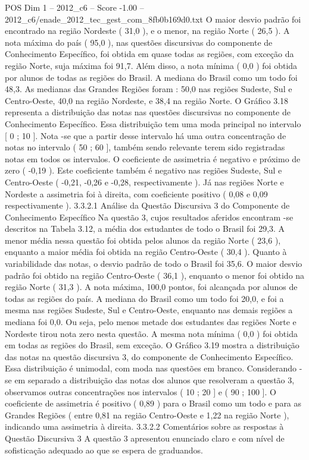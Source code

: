 \begin{textsample}{POS Dim 1 – 2012\_c6 – Score -1.00 – 2012\_c6/enade\_2012\_tec\_gest\_com\_8fb0b169d0.txt}
O maior desvio padrão foi encontrado na região Nordeste ( 31,0 ), e o menor, na região Norte ( 26,5 ).
A nota máxima do país ( 95,0 ), nas questões discursivas do componente de Conhecimento Específico, foi obtida em quase todas as regiões, com exceção da região Norte, suja máxima foi 91,7.
Além disso, a nota mínima ( 0,0 ) foi obtida por alunos de todas as regiões do Brasil.
A mediana do Brasil como um todo foi 48,3.
As medianas das Grandes Regiões foram : 50,0 nas regiões Sudeste, Sul e Centro-Oeste, 40,0 na região Nordeste, e 38,4 na região Norte.
O Gráfico 3.18 representa a distribuição das notas nas questões discursivas no componente de Conhecimento Específico.
Essa distribuição tem uma moda principal no intervalo [ 0 ; 10 ].
Nota -se que a partir desse intervalo há uma outra concentração de notas no intervalo ( 50 ; 60 ], também sendo relevante terem sido registradas notas em todos os intervalos.
O coeficiente de assimetria é negativo e próximo de zero ( -0,19 ).
Este coeficiente também é negativo nas regiões Sudeste, Sul e Centro-Oeste ( -0,21, -0,26 e -0,28, respectivamente ).
Já nas regiões Norte e Nordeste a assimetria foi à direita, com coeficiente positivo ( 0,08 e 0,09 respectivamente ). 3.3.2.1 Análise da Questão Discursiva 3 do Componente de Conhecimento Específico Na questão 3, cujos resultados aferidos encontram -se descritos na Tabela 3.12, a média dos estudantes de todo o Brasil foi 29,3.
A menor média nessa questão foi obtida pelos alunos da região Norte ( 23,6 ), enquanto a maior média foi obtida na região Centro-Oeste ( 30,4 ).
Quanto à variabilidade das notas, o desvio padrão de todo o Brasil foi 35,6.
O maior desvio padrão foi obtido na região Centro-Oeste ( 36,1 ), enquanto o menor foi obtido na região Norte ( 31,3 ).
A nota máxima, 100,0 pontos, foi alcançada por alunos de todas as regiões do país.
A mediana do Brasil como um todo foi 20,0, e foi a mesma nas regiões Sudeste, Sul e Centro-Oeste, enquanto nas demais regiões a mediana foi 0,0.
Ou seja, pelo menos metade dos estudantes das regiões Norte e Nordeste tirou nota zero nesta questão.
A mesma nota mínima ( 0,0 ) foi obtida em todas as regiões do Brasil, sem exceção.
O Gráfico 3.19 mostra a distribuição das notas na questão discursiva 3, do componente de Conhecimento Específico.
Essa distribuição é unimodal, com moda nas questões em branco.
Considerando -se em separado a distribuição das notas dos alunos que resolveram a questão 3, observamos outras concentrações nos intervalos ( 10 ; 20 ] e ( 90 ; 100 ].
O coeficiente de assimetria é positivo ( 0,89 ) para o Brasil como um todo e para as Grandes Regiões ( entre 0,81 na região Centro-Oeste e 1,22 na região Norte ), indicando uma assimetria à direita. 3.3.2.2 Comentários sobre as respostas à Questão Discursiva 3 A questão 3 apresentou enunciado claro e com nível de sofisticação adequado ao que se espera de graduandos.

\end{textsample}
